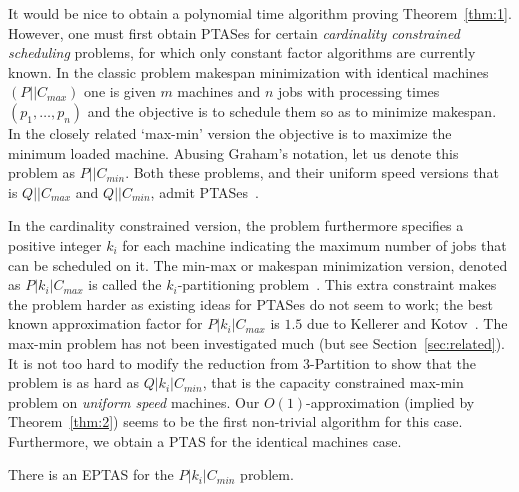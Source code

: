 It would be nice to obtain a polynomial time algorithm proving Theorem~\ref{thm:1}.
However, one must first obtain PTASes for certain {\em cardinality constrained scheduling} problems, for which only constant factor algorithms are currently known.
In the classic problem makespan minimization with identical machines $(P||C_{max})$ one is given $m$ machines and $n$ jobs with processing times $(p_1,\ldots,p_n)$	and the objective is to schedule them so as to minimize makespan.
In the closely related `max-min' version the objective is to maximize the minimum loaded machine. Abusing Graham's notation, let us denote this problem as $P||C_{min}$.
Both these problems, and their uniform speed versions that is $Q||C_{max}$ and $Q||C_{min}$, admit PTASes~\cite{bibid}. 

In the cardinality constrained version, the problem furthermore specifies a positive integer $k_i$ for each machine indicating the maximum number of jobs that can be scheduled on it. The min-max or makespan minimization version, denoted as $P|k_i|C_{max}$ is called the $k_i$-partitioning problem~\cite{bibid}.  This extra constraint makes the problem harder as existing ideas for PTASes do not seem to work; the best known approximation factor for $P|k_i|C_{max}$ is $1.5$ due to Kellerer and Kotov~\cite{KK11}.
The max-min problem has not been investigated much (but see Section~\ref{sec:related}).
It is not too hard to modify the reduction from $3$-Partition to show that the \mckc problem is as hard as $Q|k_i|C_{min}$, that is the capacity constrained max-min problem on {\em uniform speed} machines.
Our $O(1)$-approximation (implied by Theorem~\ref{thm:2}) seems to be the first non-trivial algorithm for this case. 
Furthermore, we obtain a PTAS for the identical machines case. 
\begin{theorem}\label{thm:q}
	There is an EPTAS for the $P|k_i|C_{min}$ problem.
\end{theorem}



